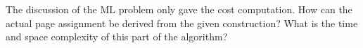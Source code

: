 The discussion of the ML problem only gave the cost computation. How
can the actual page assignment be derived from the given construction?
What is the time and space complexity of this part of the algorithm?
